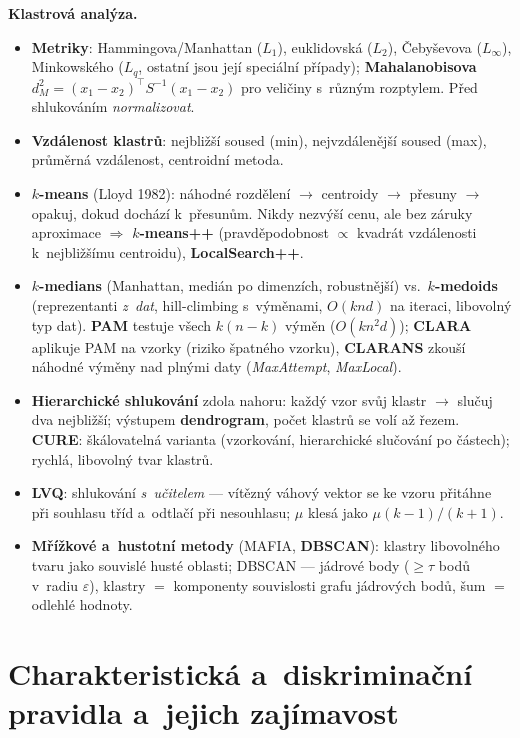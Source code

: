 \documentclass[11pt,a4paper]{article}
\theoremstyle{definition}
\begin{document}
\textbf{Klastrová analýza.}
\begin{itemize}
\item \textbf{Metriky}: Hammingova/Manhattan ($L_1$), euklidovská ($L_2$), Čebyševova
      ($L_\infty$), Minkowského ($L_q$, ostatní jsou její speciální případy);
      \textbf{Mahalanobisova} $d_M^2=(x_1-x_2)^{\!\top}S^{-1}(x_1-x_2)$ pro veličiny
      s~různým rozptylem. Před shlukováním \emph{normalizovat}.
\item \textbf{Vzdálenost klastrů}: nejbližší soused (min), nejvzdálenější soused (max),
      průměrná vzdálenost, centroidní metoda.
\item \textbf{$k$-means} (Lloyd 1982): náhodné rozdělení $\to$ centroidy $\to$ přesuny
      $\to$ opakuj, dokud dochází k~přesunům. Nikdy nezvýší cenu, ale bez záruky aproximace
      $\Rightarrow$ \textbf{$k$-means++} (pravděpodobnost $\propto$ kvadrát vzdálenosti
      k~nejbližšímu centroidu), \textbf{LocalSearch++}.
\item \textbf{$k$-medians} (Manhattan, medián po dimenzích, robustnější) vs.\
      \textbf{$k$-medoids} (reprezentanti \emph{z~dat}, hill-climbing s~výměnami,
      $O(knd)$ na iteraci, libovolný typ dat). \textbf{PAM} testuje všech $k(n-k)$ výměn
      ($O(kn^2d)$); \textbf{CLARA} aplikuje PAM na vzorky (riziko špatného vzorku),
      \textbf{CLARANS} zkouší náhodné výměny nad plnými daty (\emph{MaxAttempt},
      \emph{MaxLocal}).
\item \textbf{Hierarchické shlukování} zdola nahoru: každý vzor svůj klastr $\to$ slučuj dva
      nejbližší; výstupem \textbf{dendrogram}, počet klastrů se volí až řezem.
      \textbf{CURE}: škálovatelná varianta (vzorkování, hierarchické slučování po částech);
      rychlá, libovolný tvar klastrů.
\item \textbf{LVQ}: shlukování \emph{s~učitelem} --- vítězný váhový vektor se ke vzoru
      přitáhne při souhlasu tříd a~odtlačí při nesouhlasu; $\mu$ klesá jako $\mu(k-1)/(k+1)$.
\item \textbf{Mřížkové a~hustotní metody} (MAFIA, \textbf{DBSCAN}): klastry libovolného
      tvaru jako souvislé husté oblasti; DBSCAN --- jádrové body ($\ge\tau$ bodů v~radiu
      $\varepsilon$), klastry $=$ komponenty souvislosti grafu jádrových bodů, šum $=$
      odlehlé hodnoty.
\end{itemize}

\newpage
\section{Charakteristická a~diskriminační pravidla a~jejich zajímavost}
\label{sec:pravidla}
\end{document}
